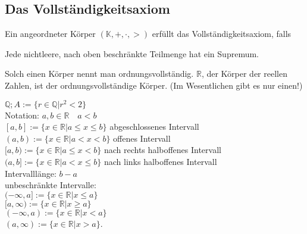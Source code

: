 \documentclass[../ana1.tex]{subfiles}
\begin{document}
\subsection{Das Vollständigkeitsaxiom}
\begin{defi}
	Ein angeordneter Körper \( (\mathbb{K},+,\cdot,>)\) erfüllt das Vollständigkeitsaxiom, falls
	\begin{center}
		Jede nichtleere, nach oben beschränkte Teilmenge hat ein Supremum.
	\end{center}
	Solch einen Körper nennt man ordnungsvollständig. \(\mathbb{R}\), der Körper der reellen Zahlen, ist der ordnungsvollständige Körper. (Im Wesentlichen gibt es nur einen!)
\end{defi}
\( \mathbb{Q}; A:= \{r\in\mathbb{Q}|r^2 < 2\} \) \\
Notation: 
\(a,b\in\mathbb{R} \quad a<b\) \\
\([a,b] := \{x\in\mathbb{R}|a\leq x\leq b\} \) abgeschlossenes Intervall\\
\((a,b) := \{x\in\mathbb{R} | a<x<b\} \) offenes Intervall\\
\([a,b) := \{x\in\mathbb{R}|a\leq x<b\} \) nach rechts halboffenes Intervall\\
\((a,b] := \{x\in\mathbb{R}|a<x\leq b\} \) nach links halboffenes Intervall\\
Intervalllänge: \(b-a\) \\
unbeschränkte Intervalle:\\
\((-\infty, a] := \{x\in\mathbb{R}|x\leq a\} \) \\
\([a,\infty) := \{x\in\mathbb{R}|x\geq a\} \) \\
\((-\infty, a) := \{x\in\mathbb{R}|x<a\} \) \\
\((a, \infty) := \{x\in\mathbb{R}|x>a\} \).
\end{document}
